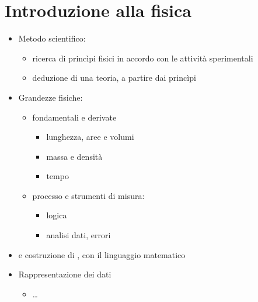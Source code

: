 \documentclass[letterpaper,10pt,italian]{jupyterBook}
\begin{document}
\chapter{Introduzione alla fisica}
\label{\detokenize{ch/intro:introduzione-alla-fisica}}\label{\detokenize{ch/intro:physics-hs-intro}}\label{\detokenize{ch/intro::doc}}\begin{itemize}
\item {} 
\sphinxAtStartPar
Metodo scientifico:
\begin{itemize}
\item {} 
\sphinxAtStartPar
ricerca di princìpi fisici in accordo con le attività sperimentali

\item {} 
\sphinxAtStartPar
deduzione di una teoria, a partire dai princìpi

\end{itemize}

\item {} 
\sphinxAtStartPar
Grandezze fisiche:
\begin{itemize}
\item {} 
\sphinxAtStartPar
fondamentali e derivate
\begin{itemize}
\item {} 
\sphinxAtStartPar
lunghezza, aree e volumi

\item {} 
\sphinxAtStartPar
massa e densità

\item {} 
\sphinxAtStartPar
tempo

\end{itemize}

\item {} 
\sphinxAtStartPar
processo e strumenti di misura:
\begin{itemize}
\item {} 
\sphinxAtStartPar
logica  

\item {} 
\sphinxAtStartPar
analisi dati, errori

\end{itemize}

\end{itemize}

\item {} 
\sphinxAtStartPar
{} e costruzione di , con il linguaggio matematico

\item {} 
\sphinxAtStartPar
Rappresentazione dei dati
\begin{itemize}
\item {} 
\sphinxAtStartPar
…

\end{itemize}

\end{itemize}
\end{document}

